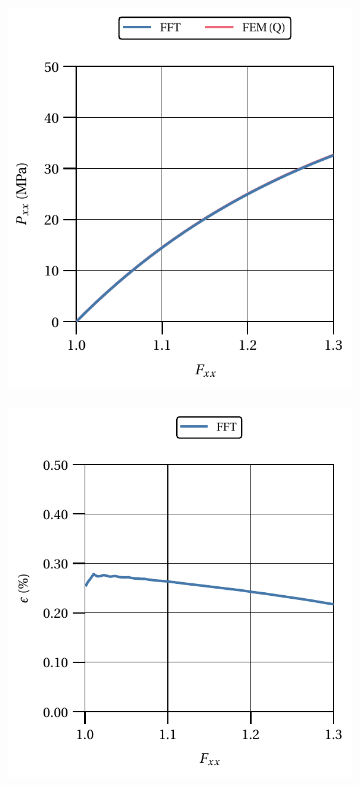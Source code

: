 \begin{figure}[hbt]
  \centering
	\begin{subfigure}[b]{0.49\textwidth}
    \centering
    \includegraphics[width=\textwidth]{figures/hencky_3D_normal_material_response}
    \caption{}
    \label{subfig:hencky_3D_normal_material_response}
  \end{subfigure}
  \begin{subfigure}[b]{0.49\textwidth}
    \centering
    \includegraphics[width=\textwidth]{figures/hencky_3D_normal_material_response_error}

\end{subfigure}
\end{figure}
